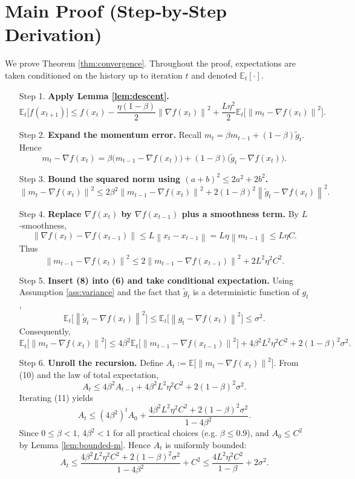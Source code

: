 \documentclass{article}
\newcommand{\EE}{\mathbb{E}}
\newcommand{\norm}[1]{\left\lVert#1\right\rVert}
\newcommand{\grad}{\nabla}
\begin{document}
\section*{Main Proof (Step‑by‑Step Derivation)}
We prove Theorem \ref{thm:convergence}. Throughout the proof, expectations are taken
conditioned on the history up to iteration $t$ and denoted $\EE_t[\cdot]$.

\begin{enumerate}
\item[Step 1.] \textbf{Apply Lemma \ref{lem:descent}.}
\[
\EE_t\!\bigl[f(x_{t+1})\bigr]
\le f(x_t)-\frac{\eta(1-\beta)}{2}\norm{\grad f(x_t)}^2
+\frac{L\eta^2}{2}\EE_t\!\bigl[\norm{m_t-\grad f(x_t)}^2\bigr].
\tag{4}
\]

\item[Step 2.] \textbf{Expand the momentum error.}
Recall $m_t=\beta m_{t-1}+(1-\beta)\tilde g_t$.
Hence
\[
m_t-\grad f(x_t)
= \beta\bigl(m_{t-1}-\grad f(x_t)\bigr)
+(1-\beta)\bigl(\tilde g_t-\grad f(x_t)\bigr). \tag{5}
\]

\item[Step 3.] \textbf{Bound the squared norm using $(a+b)^2\le2a^2+2b^2$.}
\[
\norm{m_t-\grad f(x_t)}^2
\le 2\beta^2\norm{m_{t-1}-\grad f(x_t)}^2
+2(1-\beta)^2\norm{\tilde g_t-\grad f(x_t)}^2 . \tag{6}
\]

\item[Step 4.] \textbf{Replace $\grad f(x_t)$ by $\grad f(x_{t-1})$ plus a smoothness term.}
By $L$‑smoothness,
\[
\norm{\grad f(x_t)-\grad f(x_{t-1})}\le L\norm{x_t-x_{t-1}}
= L\eta\norm{m_{t-1}} \le L\eta C. \tag{7}
\]
Thus
\[
\norm{m_{t-1}-\grad f(x_t)}^2
\le 2\norm{m_{t-1}-\grad f(x_{t-1})}^2
+2L^2\eta^2C^2 . \tag{8}
\]

\item[Step 5.] \textbf{Insert (8) into (6) and take conditional expectation.}
Using Assumption \ref{ass:variance} and the fact that $\tilde g_t$ is a deterministic
function of $g_t$,
\[
\EE_t\!\bigl[\norm{\tilde g_t-\grad f(x_t)}^2\bigr]
\le \EE_t\!\bigl[\norm{g_t-\grad f(x_t)}^2\bigr]
\le \sigma^2 . \tag{9}
\]
Consequently,
\[
\EE_t\!\bigl[\norm{m_t-\grad f(x_t)}^2\bigr]
\le 4\beta^2\EE_t\!\bigl[\norm{m_{t-1}-\grad f(x_{t-1})}^2\bigr]
+4\beta^2L^2\eta^2C^2
+2(1-\beta)^2\sigma^2 . \tag{10}
\]

\item[Step 6.] \textbf{Unroll the recursion.}
Define $A_t:=\EE\!\bigl[\norm{m_t-\grad f(x_t)}^2\bigr]$.
From (10) and the law of total expectation,
\[
A_t\le 4\beta^2 A_{t-1}+4\beta^2L^2\eta^2C^2+2(1-\beta)^2\sigma^2 . \tag{11}
\]
Iterating (11) yields
\[
A_t\le (4\beta^2)^t A_0
+ \frac{4\beta^2L^2\eta^2C^2+2(1-\beta)^2\sigma^2}{1-4\beta^2} .
\tag{12}
\]
Since $0\le\beta<1$, $4\beta^2<1$ for all practical choices (e.g. $\beta\le0.9$),
and $A_0\le C^2$ by Lemma \ref{lem:bounded-m}. Hence $A_t$ is uniformly bounded:
\[
A_t\le \frac{4\beta^2L^2\eta^2C^2+2(1-\beta)^2\sigma^2}{1-4\beta^2}+C^2
\le  \frac{4L^2\eta^2C^2}{1-\beta}+2\sigma^2 . \tag{13}
\]


\end{enumerate}
\end{document}
